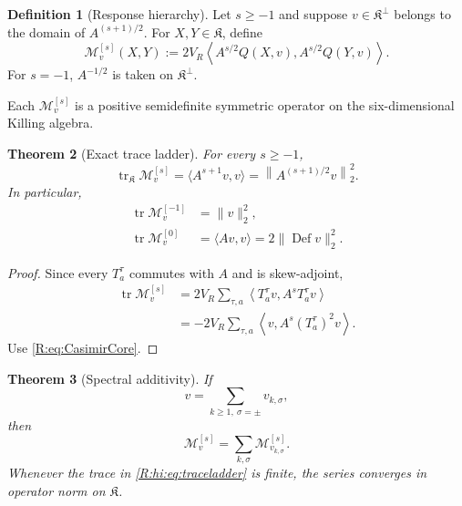 \documentclass[
 aps,
 prd,
 reprint,
 amsmath,
 amssymb,
 nofootinbib,
 superscriptaddress
]{revtex4-2}
\newtheorem{theorem}{Theorem}[section]
\theoremstyle{definition}
\newtheorem{definition}[theorem]{Definition}
\theoremstyle{remark}
\newcommand{\cM}{\mathscr M}
\newcommand{\cK}{\mathfrak K}
\newcommand{\Def}{\operatorname{Def}}
\newcommand{\tr}{\operatorname{tr}}
\begin{document}
\begin{definition}[Response hierarchy]
\label{R:hi:def:hierarchy}
Let $s\ge-1$ and suppose
$v\in\cK^\perp$ belongs to the domain of $A^{(s+1)/2}$.
For $X,Y\in\cK$, define
\begin{equation}
 \boxed{
 \cM_v^{[s]}(X,Y)
 :=
 2V_R
 \left\langle
 A^{s/2}Q(X,v),
 A^{s/2}Q(Y,v)
 \right\rangle.
 }
 \label{R:hi:eq:Ms}
\end{equation}
For $s=-1$, $A^{-1/2}$ is taken on $\cK^\perp$.
\end{definition}

Each $\cM_v^{[s]}$ is a positive semidefinite symmetric operator on the
six-dimensional Killing algebra.

\begin{theorem}[Exact trace ladder]
\label{R:hi:thm:traceladder}
For every $s\ge-1$,
\begin{equation}
 \boxed{
 \tr_{\cK}\cM_v^{[s]}
 =
 \langle A^{s+1}v,v\rangle
 =
 \left\|A^{(s+1)/2}v\right\|_2^2.
 }
 \label{R:hi:eq:traceladder}
\end{equation}
In particular,
\begin{align}
 \tr\cM_v^{[-1]}
 &=
 \|v\|_2^2,
 \label{R:hi:eq:energyresponse}\\
 \tr\cM_v^{[0]}
 &=
 \langle Av,v\rangle
 =
 2\|\Def v\|_2^2.
 \label{R:hi:eq:dissresponse}
\end{align}
\end{theorem}

\begin{proof}
Since every $T_a^\tau$ commutes with $A$ and is skew-adjoint,
\begin{align*}
 \tr\cM_v^{[s]}
 &=
 2V_R
 \sum_{\tau,a}
 \left\langle
 T_a^\tau v,A^sT_a^\tau v
 \right\rangle\\
 &=
 -2V_R
 \sum_{\tau,a}
 \left\langle
 v,A^s(T_a^\tau)^2v
 \right\rangle.
\end{align*}
Use \eqref{R:eq:CasimirCore}.
\end{proof}

\begin{theorem}[Spectral additivity]
\label{R:hi:thm:additivity}
If
\[
       v=\sum_{k\ge1,\ \sigma=\pm}v_{k,\sigma},
\]
then
\begin{equation}
 \boxed{
 \cM_v^{[s]}
 =
 \sum_{k,\sigma}
 \cM_{v_{k,\sigma}}^{[s]}.
 }
 \label{R:hi:eq:additivity}
\end{equation}
Whenever the trace in \eqref{R:hi:eq:traceladder} is finite, the series converges
in operator norm on $\cK$.
\end{theorem}
\end{document}

